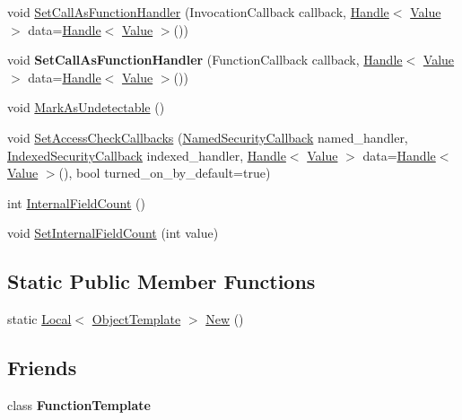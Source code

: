 \begin{DoxyCompactItemize}
\item 
void \hyperlink{classv8_1_1_object_template_a0132c34bbb52a69d13c54bf325effe6e}{Set\+Call\+As\+Function\+Handler} (Invocation\+Callback callback, \hyperlink{classv8_1_1_handle}{Handle}$<$ \hyperlink{classv8_1_1_value}{Value} $>$ data=\hyperlink{classv8_1_1_handle}{Handle}$<$ \hyperlink{classv8_1_1_value}{Value} $>$())
\item 
\hypertarget{classv8_1_1_object_template_a5a7c6acbee1a04deb7c2cd43896b34ac}{}void {\bfseries Set\+Call\+As\+Function\+Handler} (Function\+Callback callback, \hyperlink{classv8_1_1_handle}{Handle}$<$ \hyperlink{classv8_1_1_value}{Value} $>$ data=\hyperlink{classv8_1_1_handle}{Handle}$<$ \hyperlink{classv8_1_1_value}{Value} $>$())\label{classv8_1_1_object_template_a5a7c6acbee1a04deb7c2cd43896b34ac}

\item 
void \hyperlink{classv8_1_1_object_template_a7e40ef313b44c2ad336c73051523b4f8}{Mark\+As\+Undetectable} ()
\item 
void \hyperlink{classv8_1_1_object_template_acd0c47ecc715fa1256dc95524a4e8608}{Set\+Access\+Check\+Callbacks} (\hyperlink{namespacev8_ab5cafda0c556bba990c660ce9c904e0d}{Named\+Security\+Callback} named\+\_\+handler, \hyperlink{namespacev8_aebbcc7837753e51112d944ad96520da1}{Indexed\+Security\+Callback} indexed\+\_\+handler, \hyperlink{classv8_1_1_handle}{Handle}$<$ \hyperlink{classv8_1_1_value}{Value} $>$ data=\hyperlink{classv8_1_1_handle}{Handle}$<$ \hyperlink{classv8_1_1_value}{Value} $>$(), bool turned\+\_\+on\+\_\+by\+\_\+default=true)
\item 
int \hyperlink{classv8_1_1_object_template_a43de785d594d8c01b18230b1aa79e31c}{Internal\+Field\+Count} ()
\item 
void \hyperlink{classv8_1_1_object_template_ab63916ac584a76bca8ba541f86ce9fce}{Set\+Internal\+Field\+Count} (int value)
\end{DoxyCompactItemize}
\subsection*{Static Public Member Functions}
\begin{DoxyCompactItemize}
\item 
static \hyperlink{classv8_1_1_local}{Local}$<$ \hyperlink{classv8_1_1_object_template}{Object\+Template} $>$ \hyperlink{classv8_1_1_object_template_a394801526a9e9eb6df349a0eb8dfa0d0}{New} ()
\end{DoxyCompactItemize}
\subsection*{Friends}
\begin{DoxyCompactItemize}
\item 
\hypertarget{classv8_1_1_object_template_a334168ad1a5f39cf17b818ca3356aacd}{}class {\bfseries Function\+Template}\label{classv8_1_1_object_template_a334168ad1a5f39cf17b818ca3356aacd}

\end{DoxyCompactItemize}


